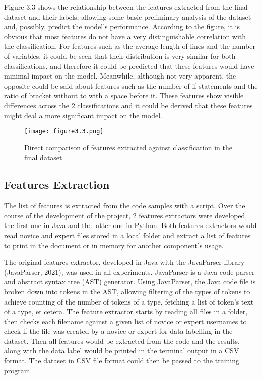 \documentclass{report}
\begin{document}
Figure 3.3 shows the relationship between the features extracted from the final dataset and their labels, allowing some basic preliminary analysis of the dataset and, possibly, predict the model’s performance. According to the figure, it is obvious that most features do not have a very distinguishable correlation with the classification. For features such as the average length of lines and the number of variables,  it could be seen that their distribution is very similar for both classifications, and therefore it could be predicted that these features would have minimal impact on the model. Meanwhile, although not very apparent, the opposite could be said about features such as the number of if statements and the ratio of bracket without to with a space before it. These features show visible differences across the 2 classifications and it could be derived that these features might deal a more significant impact on the model.

\begin{figure}[h!]
\centering
\texttt{[image: figure3.3.png]}
\caption{Direct comparison of features extracted against classification in the final dataset}
\end{figure}

\subsection{Features Extraction}

The list of features is extracted from the code samples with a script. Over the course of the development of the project, 2 features extractors were developed, the first one in Java and the latter one in Python. Both features extractors would read novice and expert files stored in a local folder and extract a list of features to print in the document or in memory for another component’s usage.

The original features extractor, developed in Java with the JavaParser library (JavaParser, 2021), was used in all experiments. JavaParser is a Java code parser and abstract syntax tree (AST) generator. Using JavaParser, the Java code file is broken down into tokens in the AST, allowing filtering of the types of tokens to achieve counting of the number of tokens of a type, fetching a list of token’s text of a type, et cetera. The feature extractor starts by reading all files in a folder, then checks each filename against a given list of novice or expert usernames to check if the file was created by a novice or expert for data labelling in the dataset. Then all features would be extracted from the code and the results, along with the data label would be printed in the terminal output in a CSV format. The dataset in CSV file format could then be passed to the training program.
\end{document}

